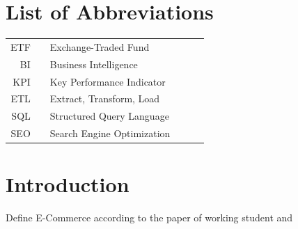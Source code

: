\documentclass[12pt,a4paper]{article}
\begin{document}
\onehalfspacing
\setcounter{tocdepth}{4}
\parindent=0in
\parskip=8pt  %
\setlength{\belowcaptionskip}{-10pt}

\newpage
\tableofcontents

\newpage

\pagebreak
\listoffigures
\newpage
\section*{List of Abbreviations}

\begin{tabular}{rp{0.2cm}lp{1cm}p{7cm}l}
    ETF     & &  \small Exchange-Traded Fund   & &      \\
    BI     & &  \small Business Intelligence   & & \\
    KPI     & &  \small Key Performance Indicator   & & \\
    ETL     & &  \small Extract, Transform, Load   & & \\
    SQL     & &  \small Structured Query Language  & & \\
    SEO     & &  \small Search Engine Optimization  & & \\
\end{tabular}

\captionsetup{justification=justified,singlelinecheck=false}

\pagebreak
{}
\flushbottom
\doublespacing
\parindent=1cm

\section{Introduction}
Define E-Commerce according to the paper of working student and 
\end{document}

